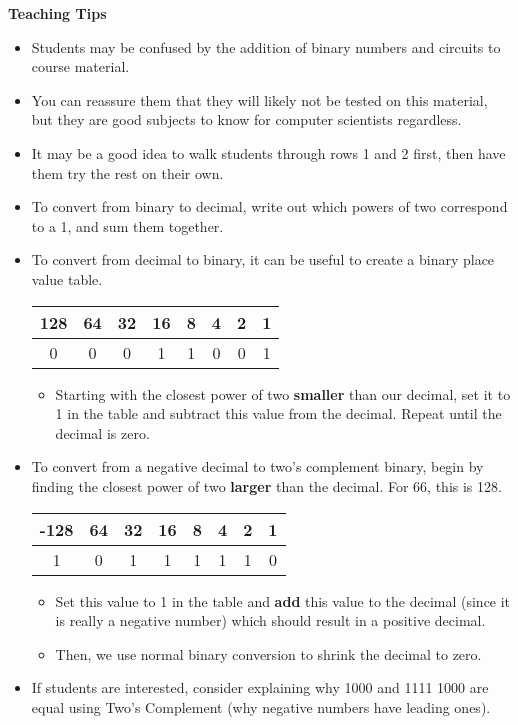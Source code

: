 \begin{blocksection}
\begin{guide}
\textbf{Teaching Tips}
\begin{itemize}
  \item Students may be confused by the addition of binary numbers and circuits to course material.
  \item You can reassure them that they will likely not be tested on this material, but they are good subjects to know for computer scientists regardless.
  \item It may be a good idea to walk students through rows 1 and 2 first, then have them try the rest on their own.
  \item To convert from binary to decimal, write out which powers of two correspond to a 1, and sum them together.
  \item To convert from decimal to binary, it can be useful to create a binary place value table.
  \begin{center}
  \begin{tabular}{|c|c|c|c|c|c|c|c|}
    \hline
    128 & 64 & 32 & 16 & 8 & 4 & 2 & 1 \\
    \hline
    0 & 0 & 0 & 1 & 1 & 0 & 0 & 1 \\
    \hline
  \end{tabular}
  \end{center}
  \begin{itemize}
    \item Starting with the closest power of two \textbf{smaller} than our decimal, set it to 1 in the table and subtract this value from the decimal. Repeat until the decimal is zero.
  \end{itemize}
  \item To convert from a negative decimal to two's complement binary, begin by finding the closest power of two \textbf{larger} than the decimal. For 66, this is 128.
  \begin{center}
  \begin{tabular}{|c|c|c|c|c|c|c|c|}
    \hline
    -128 & 64 & 32 & 16 & 8 & 4 & 2 & 1 \\
    \hline
    1 & 0 & 1 & 1 & 1 & 1 & 1 & 0 \\
    \hline
  \end{tabular}
  \end{center}
  \begin{itemize}
    \item Set this value to 1 in the table and \textbf{add} this value to the decimal (since it is really a negative number) which should result in a positive decimal.
    \item Then, we use normal binary conversion to shrink the decimal to zero.
  \end{itemize}
  \item If students are interested, consider explaining why 1000 and 1111 1000 are equal using Two's Complement (why negative numbers have leading ones).
\end{itemize}
\end{guide}
\end{blocksection}
